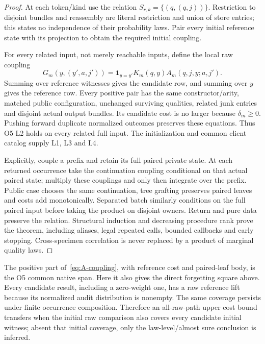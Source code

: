 \begin{proof}
At each token/kind use the relation
$S_{r,k}=\{(q,(q,j))\}$. Restriction to disjoint bundles and reassembly
are literal restriction and union of store entries; this states no
independence of their probability laws. Pair every initial reference state
with its projection to obtain the required initial coupling.

For every related input, not merely reachable inputs, define the local
raw coupling
\begin{equation}\label{eq:A-coupling}
G_m(y,(y',a,j'))=
\mathbf1_{y=y'}K_m(q,y)A_m(q,j,y;a,j').
\end{equation}
Summing over reference witnesses gives the candidate row, and summing
over $y$ gives the reference row. Every positive pair has the same
constructor/arity, matched public configuration, unchanged surviving
qualities, related junk entries and disjoint actual output bundles.
Its candidate cost is no larger because $\delta_m\geq0$.
Pushing forward duplicate normalized outcomes preserves these equations.
Thus O5 L2 holds on every related full input. The initialization and
common client catalog supply L1, L3 and L4.

Explicitly, couple a prefix and retain its full paired private state.
At each returned occurrence take the continuation coupling conditional
on that actual paired state; multiply these couplings and only then
integrate over the prefix. Public case chooses the same continuation,
tree grafting preserves paired leaves and costs add monotonically.
Separated batch similarly conditions on the full paired input before
taking the product on disjoint owners. Return and pure data preserve
the relation. Structural induction and decreasing procedure rank prove
the theorem, including aliases, legal repeated calls, bounded callbacks
and early stopping. Cross-specimen correlation is never replaced by a
product of marginal quality laws.
\end{proof}
The positive part of~\eqref{eq:A-coupling}, with reference cost and
paired-leaf body, is the O5 common native span. Here it also gives the
direct forgetting square above. Every candidate result, including a
zero-weight one, has a raw reference lift because its normalized audit
distribution is nonempty. The same coverage persists under finite
occurrence composition. Therefore an all-raw-path upper cost bound
transfers when the initial raw comparison also covers every candidate
initial witness; absent that initial coverage, only the law-level/almost
sure conclusion is inferred.

